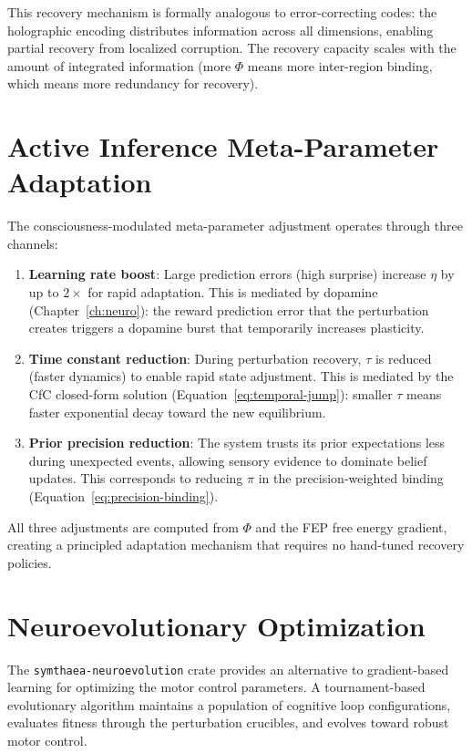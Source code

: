 \documentclass[12pt]{book}
\begin{document}
This recovery mechanism is formally analogous to error-correcting codes: the holographic encoding distributes information across all dimensions, enabling partial recovery from localized corruption. The recovery capacity scales with the amount of integrated information (more $\Phi$ means more inter-region binding, which means more redundancy for recovery).

\section{Active Inference Meta-Parameter Adaptation}

The consciousness-modulated meta-parameter adjustment operates through three channels:

\begin{enumerate}
  \item \textbf{Learning rate boost}: Large prediction errors (high surprise) increase $\eta$ by up to $2\times$ for rapid adaptation. This is mediated by dopamine (Chapter~\ref{ch:neuro}): the reward prediction error that the perturbation creates triggers a dopamine burst that temporarily increases plasticity.
  \item \textbf{Time constant reduction}: During perturbation recovery, $\tau$ is reduced (faster dynamics) to enable rapid state adjustment. This is mediated by the CfC closed-form solution (Equation~\ref{eq:temporal-jump}): smaller $\tau$ means faster exponential decay toward the new equilibrium.
  \item \textbf{Prior precision reduction}: The system trusts its prior expectations less during unexpected events, allowing sensory evidence to dominate belief updates. This corresponds to reducing $\pi$ in the precision-weighted binding (Equation~\ref{eq:precision-binding}).
\end{enumerate}

All three adjustments are computed from $\Phi$ and the FEP free energy gradient, creating a principled adaptation mechanism that requires no hand-tuned recovery policies.

\section{Neuroevolutionary Optimization}

The \texttt{symthaea-neuroevolution} crate provides an alternative to gradient-based learning for optimizing the motor control parameters. A tournament-based evolutionary algorithm maintains a population of cognitive loop configurations, evaluates fitness through the perturbation crucibles, and evolves toward robust motor control.
\end{document}

